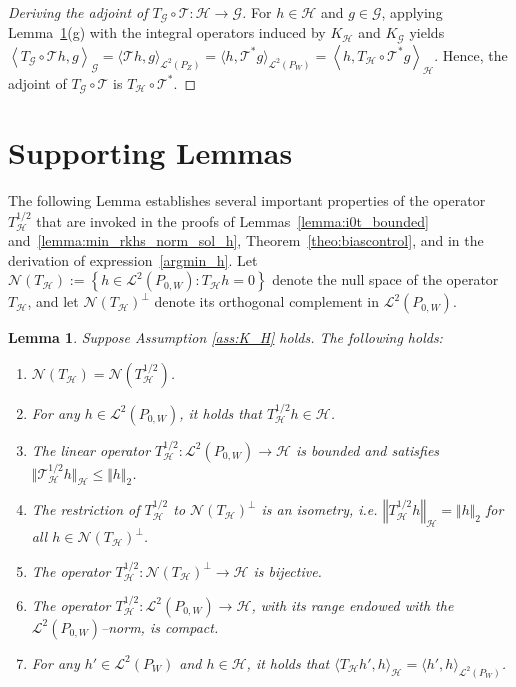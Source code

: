 \documentclass[twoside,11pt]{article}
\newtheorem{lemma}{Lemma}
\newcommand{\mc}{\mathcal}
\begin{document}
\begin{proof}[Deriving the adjoint of $T_\mc{G} \circ \mc{T} : \mc{H} \rightarrow \mc{G}$]
    For $h\in\mc{H}$ and $g\in\mc{G}$, applying Lemma~\ref{lemma:null_space}(g) with the integral operators induced by $K_\mc{H}$ and $K_\mc{G}$ yields $\left\langle T_\mc{G} \circ \mc{T} h,g \right\rangle_\mc{G}=\langle \mc{T}h,g\rangle_{\mc{L}^2(P_Z)}=\langle h,\mc{T}^*g\rangle_{\mc{L}^2(P_W)}=\left\langle h,T_\mc{H}\circ \mc{T}^*g\right\rangle_\mc{H}$.
Hence, the adjoint of $T_\mc{G} \circ \mc{T}$ is $T_\mc{H} \circ \mc{T}^*$.
\end{proof}


\section{Supporting Lemmas}\label{sec:proof_lemmas}

  The following Lemma establishes several important properties of the operator $T_{\mc{H}}^{1/2}$ that are invoked in the proofs of Lemmas~\ref{lemma:i0t_bounded} and~\ref{lemma:min_rkhs_norm_sol_h}, Theorem~\ref{theo:biascontrol}, and in the derivation of expression~\eqref{argmin_h}. Let $\mc{N}(T_\mc{H}):=\left\{h\in\mc{L}^2(P_{0,W}):T_{\mc{H}}h=0\right\}$ denote the null space of the operator $T_{\mc{{H}}}$, and let $\mc{N}(T_\mc{H})^\perp$ denote its orthogonal complement in $\mc{L}^2(P_{0,W})$. 

  \begin{lemma} Suppose Assumption \ref{ass:K_H} holds. The following holds:
        \begin{enumerate}
        \item[a)] $\mc{N}(T_{\mc{H}})=\mc{N}(T_{\mc{H}}^{1/2})$.
        \item[b)] For any $h\in \mc{L}^2(P_{0,W})$, it holds that $T_{\mc{H}}^{1/2}h\in\mc{H}$.
        \item[c)] The linear operator $T_{\mc{H}}^{1/2}:\mc{L}^2(P_{0,W})\rightarrow \mc{H}$ is bounded and satisfies $\Vert\mc{T}_{\mc{H}}^{1/2}h\Vert_{\mc{H}} \leq \Vert h\Vert_2$.
        \item[d)] The restriction of $T_{\mc{H}}^{1/2}$ to $\mc{N}(T_\mc{H})^\perp$ is an isometry, i.e. $\left\Vert  T_{\mc{H}}^{1/2} h\right\Vert_{\mc{H}}=\Vert h\Vert_2$ for all  $h\in\mc{N}(T_\mc{H})^\perp$.
        \item[e)] The operator $T_{\mc{H}}^{1/2}:\mc{N}(T_\mc{H})^\perp \rightarrow\mc{H}$ is bijective.
        \item[f)] The operator $T_{\mc{H}}^{1/2}:\mc{L}^2(P_{0,W}) \rightarrow  \mc{H}$, with its range endowed with the $\mc{L}^2(P_{0,W})$--norm, is compact.
         \item[g)] For any $h'\in\mc{L}^2(P_W)$ and $h\in\mc{H}$, it holds that $\langle T_\mc{H}h',h\rangle_\mc{H}=\langle h',h\rangle_{\mc{L}^2(P_W)}$.
        \end{enumerate}
        \label{lemma:null_space}
  \end{lemma}
  
\end{document}
